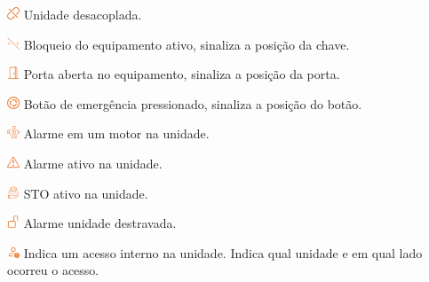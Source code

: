 \begin{alarmIcons}

\item[\ding{\dingNumber}] \includegraphics[height=1em]{src/imagesICV/13-alarmsScreen/overview/disconnect-orange.png} Unidade desacoplada.
\item[\ding{\dingNumber}] \includegraphics[height=1em]{src/imagesICV/13-alarmsScreen/overview/don't-move-orange.png} Bloqueio do equipamento ativo, sinaliza a posição da chave.
\item[\ding{\dingNumber}] \includegraphics[height=1em]{src/imagesICV/13-alarmsScreen/overview/door-open-orange.png} Porta aberta no equipamento, sinaliza a posição da porta.
\item[\ding{\dingNumber}] \includegraphics[height=1em]{src/imagesICV/13-alarmsScreen/overview/emergency-stop-orange.png} Botão de emergência pressionado, sinaliza a posição do botão.
\item[\ding{\dingNumber}] \includegraphics[height=1em]{src/imagesICV/13-alarmsScreen/overview/engine-orange.png} Alarme em um motor na unidade.
\item[\ding{\dingNumber}] \includegraphics[height=1em]{src/imagesICV/13-alarmsScreen/overview/exclamation-triangle-orange.png} Alarme ativo na unidade.
\item[\ding{\dingNumber}] \includegraphics[height=1em]{src/imagesICV/13-alarmsScreen/overview/helmet-orange.png} STO ativo na unidade.
\item[\ding{\dingNumber}] \includegraphics[height=1em]{src/imagesICV/13-alarmsScreen/overview/unlock-orange.png} Alarme unidade destravada.
\item[\ding{\dingNumber}] \includegraphics[height=1em]{src/imagesICV/13-alarmsScreen/overview/person-exclamation-orange.png} Indica um acesso interno na unidade. 
Indica qual unidade e em qual lado ocorreu o acesso.


\end{alarmIcons}

